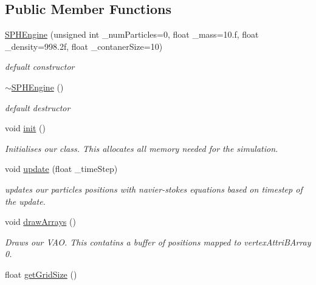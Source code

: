 \subsection*{Public Member Functions}
\begin{DoxyCompactItemize}
\item 
\hyperlink{class_s_p_h_engine_a8be3b3f99242c3548ade6ff9314fc46c}{S\-P\-H\-Engine} (unsigned int \-\_\-num\-Particles=0, float \-\_\-mass=10.f, float \-\_\-density=998.\-2f, float \-\_\-contaner\-Size=10)
\begin{DoxyCompactList}\small\item\em defualt constructor \end{DoxyCompactList}\item 
\hypertarget{class_s_p_h_engine_a0969407c141667c1147d409a0397257d}{\hyperlink{class_s_p_h_engine_a0969407c141667c1147d409a0397257d}{$\sim$\-S\-P\-H\-Engine} ()}\label{class_s_p_h_engine_a0969407c141667c1147d409a0397257d}

\begin{DoxyCompactList}\small\item\em default destructor \end{DoxyCompactList}\item 
\hypertarget{class_s_p_h_engine_a0df6d1b33d50afb152e2992de5af5700}{void \hyperlink{class_s_p_h_engine_a0df6d1b33d50afb152e2992de5af5700}{init} ()}\label{class_s_p_h_engine_a0df6d1b33d50afb152e2992de5af5700}

\begin{DoxyCompactList}\small\item\em Initialises our class. This allocates all memory needed for the simulation. \end{DoxyCompactList}\item 
void \hyperlink{class_s_p_h_engine_a1a17b5c04756850b68cf95b917019241}{update} (float \-\_\-time\-Step)
\begin{DoxyCompactList}\small\item\em updates our particles positions with navier-\/stokes equations based on timestep of the update. \end{DoxyCompactList}\item 
\hypertarget{class_s_p_h_engine_a91f224d67175615716059dba23c38a98}{void \hyperlink{class_s_p_h_engine_a91f224d67175615716059dba23c38a98}{draw\-Arrays} ()}\label{class_s_p_h_engine_a91f224d67175615716059dba23c38a98}

\begin{DoxyCompactList}\small\item\em Draws our V\-A\-O. This contatins a buffer of positions mapped to vertex\-Attri\-B\-Array 0. \end{DoxyCompactList}\item 
\hypertarget{class_s_p_h_engine_ab5811f68d71d923ac3a8e24d2d220d7b}{float \hyperlink{class_s_p_h_engine_ab5811f68d71d923ac3a8e24d2d220d7b}{get\-Grid\-Size} ()}\label{class_s_p_h_engine_ab5811f68d71d923ac3a8e24d2d220d7b}


\end{DoxyCompactItemize}
